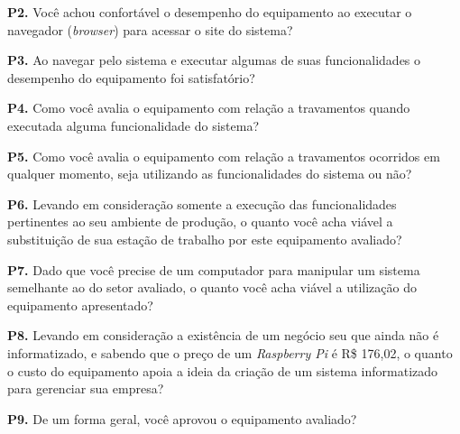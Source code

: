 \textbf{P2.} Você achou confortável o desempenho do equipamento ao executar o navegador (\textit{browser}) para acessar o site do sistema?

\textbf{P3.} Ao navegar pelo sistema e executar algumas de suas funcionalidades o desempenho do equipamento foi satisfatório?

\textbf{P4.} Como você avalia o equipamento com relação a travamentos quando executada alguma funcionalidade do sistema?

\textbf{P5.} Como você avalia o equipamento com relação a travamentos ocorridos em qualquer momento, seja utilizando as funcionalidades do sistema ou não?

\textbf{P6.} Levando em consideração somente a execução das funcionalidades pertinentes ao seu ambiente de produção, o quanto você acha viável a substituição de sua estação de trabalho por este equipamento avaliado?

\textbf{P7.} Dado que você precise de um computador para manipular um sistema semelhante ao do setor avaliado, o quanto você acha viável a utilização do equipamento apresentado?

\textbf{P8.} Levando em consideração a existência de um negócio seu que ainda não é informatizado, e sabendo que o preço de um \textit{Raspberry Pi} é  R\$ 176,02, o quanto o custo do equipamento apoia a ideia da criação de um sistema informatizado para gerenciar sua empresa?

\textbf{P9.} De um forma geral, você aprovou o equipamento avaliado?
